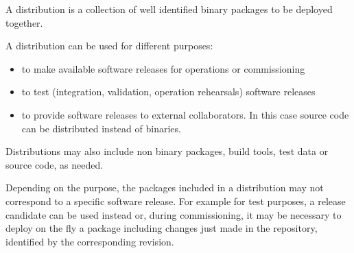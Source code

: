 A distribution is a collection of well identified binary packages to be deployed together.

A distribution can be used for different purposes:

\begin{itemize}
\item to make available software releases for operations or commissioning
\item to test (integration, validation, operation rehearsals) software releases
\item to provide software releases to external collaborators. In this case source code can be distributed instead of binaries.
\end{itemize}

Distributions may also include non binary packages, build tools, test data or source code, as needed.

Depending on the purpose, the packages included in a distribution may not correspond to a specific software release.
For example for test purposes, a release candidate can be used instead or, during commissioning,
it may be necessary to deploy on the fly a package including changes just made in the repository,
identified by the corresponding revision.

